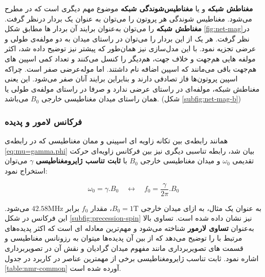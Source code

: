 \textbf{مغناطش شبکه} و یا \textbf{مغناطیس‌شوندگی شبکه} 
موضوع مهم دیگری است که در \mri مطرح می‌شود.
مغناطیس شوندگی هر پروتون را می‌توان به عنوان یک بردار در‌نظر گرفت. \textbf{مغناطش شبکه} را می‌توان به‌عنوان برایند آن بردار ها مطابق شکل \ref{fig:net-mag}در نظر گرفت. 
هر یک از این بردار را می‌توان در راستای میدان به دو مولفه‌ی طولی و عرضی تجزیه نمود. با این مدل‌سازی نیز همان‌طور که پیشتر نیز توضیح داده شد، اکثر مولفه هایی هم‌جهت و خلاف جهت، هم‌دیگر را کنسل می‌کنند و تعداد کمی اسپین های هم‌جهت باقی می‌مانند که اسپین اضافه نام داشتند. اما موله‌عرضی صفر است. چراکه اسپین پروتون‌ها فاز تصادفی دارند و بنابراین برایند آنان صفر می‌شود. این یعنی مغناطش شبکه، مولفه‌ای در راستای عرضی ندارد و صرفا در راستای مولفه‌ی طولی یا همان راستای میدان مغناطیسی خارجی $B_0$ می‌باشد. (شکل \ref{subfig:net-mag-b})

\subsubsection{ فرکانس لامور و پدیده \nmr}

همانند رابطه‌ی بین تکانه زاویه ای اسپینی و ممان مغناطیسی که در رابطه‌ی \ref{eq:mu=gamma.phi} بیان شد، رابطه تناسبی دیگری نیز بین فرکانس زاویه‌ای حرکت تقدیمی $\omega_0$ و میدان مغناطیسی خارجی $B_0$  
با \textbf{ثابت تناسب ژایرومغناطیسی}
$\gamma$
می‌توان استخراج نمود:


\removevspace
\begin{equation}\label{eq:larmor}
	\omega_0 = \gamma . B_0 \quad \leftrightarrow \quad f_0 = \frac{\gamma}{2\pi}. B_0
\end{equation}

به عنوان یک مثال، به ازای میدان خارجی $B_0=1 \mathrm{T}$، مقدار $f_0$ برابر $42.58 \mathrm{MHz}$ می‌شود. این فرکانس در شکل \ref{subfig:precession-spin}
نیز نشان داده شده است.
تساوی بالا به‌عنوان \textbf{تساوی لارمور}
شناخته می‌شود و مهم‌ترین معادله ای است که اکثر پدیده‌های مرتبط با \mri را توضیح می‌دهد که از بین آن پدیده‌ها میتوان به رزونانس مغناطیسی و قسمت های تصویر‌برداری مانند مفهوم میدان گرادیان و نقش آن در تصویر‌برداری اشاره نمود. ثابت تناسب ژایرومغناطیسی برخی از مهمترین عناصر در کاربرد \mri در جدول \ref{table:nmr-common} آورده شده است.


